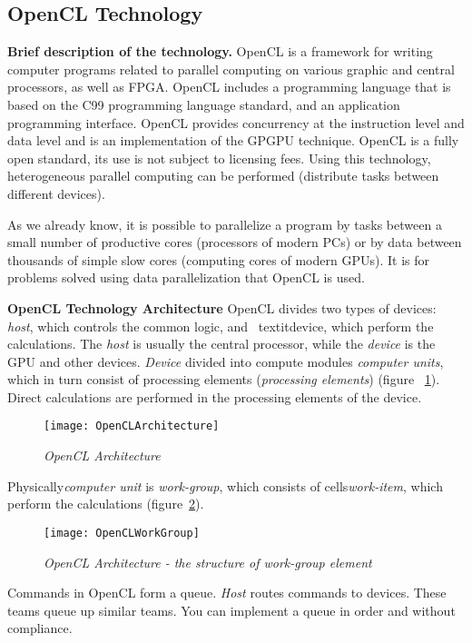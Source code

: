 { %
	\subsection{OpenCL Technology}
	\label{OpenCL:section}
	\par\textbf{Brief description of the technology.} OpenCL is a framework for writing computer programs related to parallel computing on various graphic and central processors, as well as FPGA. OpenCL includes a programming language that is based on the C99 programming language standard, and an application programming interface. OpenCL provides concurrency at the instruction level and data level and is an implementation of the GPGPU technique. OpenCL is a fully open standard, its use is not subject to licensing fees. Using this technology, heterogeneous parallel computing can be performed (distribute tasks between different devices).
	\par As we already know, it is possible to parallelize a program by tasks between a small number of productive cores (processors of modern PCs) or by data between thousands of simple slow cores (computing cores of modern GPUs). It is for problems solved using data parallelization that OpenCL is used.
	\par\textbf{OpenCL Technology Architecture} OpenCL divides two types of devices: \textit{host}, which controls the common logic, and \ textit{device}, which perform the calculations. The \textit{host} is usually the central processor, while the \textit{device} is the GPU and other devices. \textit{Device} divided into compute modules \textit{computer units}, which in turn consist of processing elements (\textit{processing elements}) (figure ~\ref{OpenCLArchitecture:image}). Direct calculations are performed in the processing elements of the device.
	\begin{figure}[H]
		\texttt{[image: OpenCLArchitecture]}
		\caption{\textit{OpenCL Architecture}}
		\label{OpenCLArchitecture:image}
	\end{figure}
	\par Physically\textit{computer unit} is \textit{work-group}, which consists of cells\textit{work-item}, which perform the calculations (figure~\ref{OpenCLWorkGroup:image}).
	\begin{figure}[H]
		\texttt{[image: OpenCLWorkGroup]}
		\caption{\textit{OpenCL  Architecture - the structure of work-group element}}
		\label{OpenCLWorkGroup:image}
	\end{figure}
	\par Commands in OpenCL form a queue. \textit {Host} routes commands to devices. These teams queue up similar teams. You can implement a queue in order and without compliance.
}
